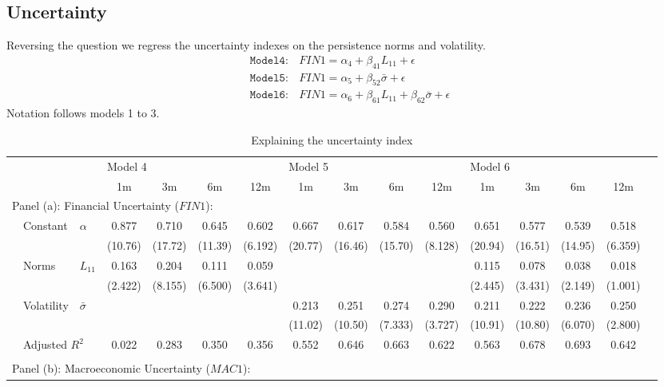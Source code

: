 \documentclass{article}
\begin{document}
\subsection{Uncertainty}

Reversing the question we regress the uncertainty indexes on the persistence norms and volatility. 
\begin{align}
    \mathtt{Model 4:} & FIN1 = \alpha_4 + \beta_{41}L_{11} + \epsilon \\
    \mathtt{Model 5:} & FIN1 = \alpha_5 + \beta_{52}\bar{\sigma} + \epsilon\\
    \mathtt{Model 6:} & FIN1 = \alpha_6 + \beta_{61}L_{11} + \beta_{62}\bar{\sigma} + \epsilon
\end{align}
Notation follows models 1 to 3.

\begin{sidewaystable}
    \begin{center}
        \caption{Explaining the uncertainty index}
        \label{tab:reg41}
        \begin{tabular}{ll l c c c c c c c c c c c c c}
        \hline
             &&& \multicolumn{4}{l}{Model 4} & \multicolumn{4}{l}{Model 5}& \multicolumn{4}{l}{Model 6}\\
             &&& 1m & 3m & 6m & 12m & 1m & 3m & 6m & 12m & 1m & 3m & 6m & 12m\\
             \hline
             \multicolumn{12}{l}{Panel (a): Financial Uncertainty ($FIN1$): }\\
             & Constant & $\alpha$ & 0.877&0.710&0.645&0.602&0.667&0.617&0.584&0.560&0.651&0.577&0.539&0.518\\
            &&&(10.76)&(17.72)&(11.39)&(6.192)&(20.77)&(16.46)&(15.70)&(8.128)&(20.94)&(16.51)&(14.95)&(6.359)\\
            & Norms & $L_{11}$&0.163&0.204&0.111&0.059&&&&&0.115&0.078&0.038&0.018\\
            &&& (2.422)&(8.155)&(6.500)&(3.641)&&&&&(2.445)&(3.431)&(2.149)&(1.001)\\
            & Volatility & $\bar{\sigma}$&&&&&0.213&0.251&0.274&0.290&0.211&0.222&0.236&0.250\\
            &&&&&&&(11.02)&(10.50)&(7.333)&(3.727)&(10.91)&(10.80)&(6.070)&(2.800)\\
            & \multicolumn{2}{l}{Adjusted $R^2$}&0.022&0.283&0.350&0.356&0.552&0.646&0.663&0.622&0.563&0.678&0.693&0.642\\
             &&&&&&&\\
             \multicolumn{9}{l}{Panel (b): Macroeconomic Uncertainty ($MAC1$): }\\

\end{tabular}
\end{center}
\end{sidewaystable}
\end{document}
